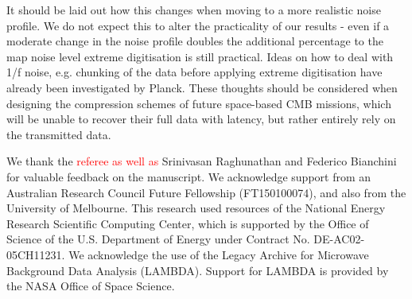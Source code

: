\documentclass[apj]{emulateapj}
\newcommand{\changed}[1]{\textcolor{Red}{#1}}
\begin{document}
It should be laid out how this changes when moving to a more realistic noise profile. We do not expect this to alter the practicality of our results - even if a moderate change in the noise profile doubles the additional percentage to the map noise level extreme digitisation is still practical. Ideas on how to deal with 1/f noise, e.g. chunking of the data before applying extreme digitisation have already been investigated by Planck. These thoughts should be considered when designing the compression schemes of future space-based CMB missions, which will be unable to recover their full data with latency, but rather entirely rely on the transmitted data.

\acknowledgments %

We thank the \changed{referee as well as} Srinivasan Raghunathan and Federico Bianchini for valuable feedback on the manuscript. 
We acknowledge support from an Australian Research Council Future Fellowship (FT150100074), and also from the University of Melbourne. 
This research used resources of the National Energy Research Scientific Computing Center, which is supported by the Office of Science of the U.S. Department of Energy under Contract No. DE-AC02-05CH11231. 
We acknowledge the use of the Legacy Archive for Microwave Background Data Analysis (LAMBDA). Support for LAMBDA is provided by the NASA Office of Space Science.



\end{document}
